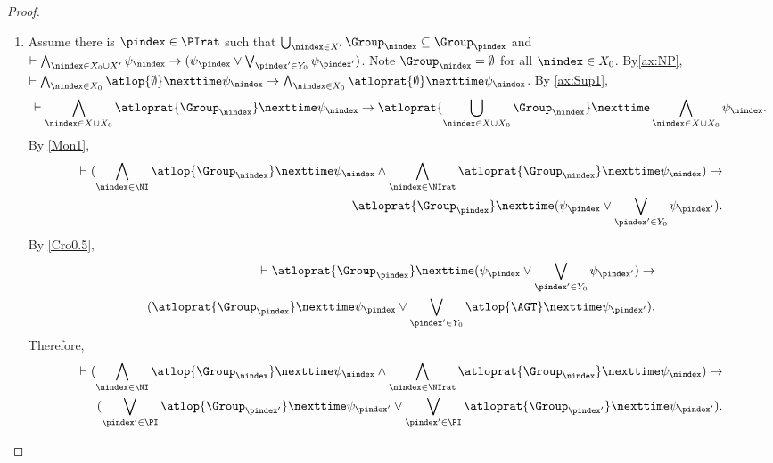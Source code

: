 \begin{proof}
\begin{enumerate}[label={Case \arabic*}]
    \item\label{case 2} Assume there is $\pindex\in \PIrat$ such that $\bigcup_{\nindex\in X'} \Group_\nindex\subseteq \Group_\pindex$ and $
    \vdash \bigwedge_{\nindex\in X_0\cup X'} \psi_\nindex 
    \to (\psi_\pindex\vee \bigvee_{\pindex'\in Y_0}\psi_{\pindex'})$.
    Note $\Group_\nindex = \emptyset $ for all $\nindex\in X_0$. By\ref{ax:NP}, $\vdash 
    \bigwedge_{\nindex\in X_0}\atlop{\emptyset }\nexttime \psi_\nindex \to \bigwedge_{\nindex\in X_0}\atloprat{\emptyset }\nexttime \psi_\nindex$.
    By \ref{ax:Sup1}, $$\vdash 
    \bigwedge_{\nindex\in X\cup X_0}\atloprat{\Group_\nindex}\nexttime \psi_\nindex 
    \to  
    \atloprat{\bigcup_{\nindex\in X\cup X_0}\Group_\nindex}\nexttime \bigwedge_{\nindex\in X\cup X_0}\psi_\nindex.$$  
    By \ref{Mon1}, \begin{align*}
     \vdash 
    (\bigwedge_{\nindex\in \NI}\atlop{\Group_\nindex}\nexttime \psi_\nindex 
    \wedge 
    \bigwedge_{\nindex\in \NIrat}\atloprat{\Group_\nindex}\nexttime \psi_\nindex)
    \to \\
    \atloprat{\Group_\pindex}\nexttime (\psi_\pindex\vee \bigvee_{\pindex'\in Y_0}\psi_{\pindex'}).
    \end{align*}
    By \ref{Cro0.5}, \begin{align*}
    \vdash 
    \atloprat{\Group_\pindex}\nexttime (\psi_\pindex\vee \bigvee_{\pindex'\in Y_0}\psi_{\pindex'})\to \\ (\atloprat{\Group_\pindex}\nexttime \psi_\pindex\vee \bigvee_{\pindex'\in Y_0}\atlop{\AGT} \nexttime \psi_{\pindex'}).\end{align*}
    Therefore, \begin{align*}
    \vdash 
    (\bigwedge_{\nindex\in \NI}\atlop{\Group_\nindex}\nexttime \psi_\nindex 
    \wedge 
    \bigwedge_{\nindex\in \NIrat}\atloprat{\Group_\nindex}\nexttime \psi_\nindex )
    \to \\
    (\bigvee_{\pindex'\in \PI}\atlop{\Group_{\pindex'}}\nexttime \psi_{\pindex'}\vee \bigvee_{\pindex'\in \PI}\atloprat{\Group_{\pindex'}}\nexttime \psi_{\pindex'}).
    \end{align*}
  

\end{enumerate}
\end{proof}
